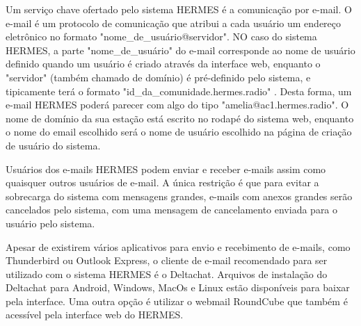 \documentclass[11pt,a4paper]{article}
\begin{document}
Um serviço chave ofertado pelo sistema HERMES é a comunicação por e-mail. O e-mail é um protocolo de comunicação que atribui a cada usuário um endereço eletrônico no formato "nome\_de\_usuário@servidor". NO caso do sistema HERMES, a parte "nome\_de\_usuário" do e-mail corresponde ao nome de usuário definido quando um usuário é criado através da interface web, enquanto o "servidor" (também chamado de domínio) é pré-definido pelo sistema, e tipicamente terá o formato "id\_da\_comunidade.hermes.radio" . Desta forma, um e-mail HERMES poderá parecer com algo do tipo "amelia@ac1.hermes.radio". O nome de domínio da sua estação está escrito no rodapé do sistema web,
enquanto o nome do email escolhido será o nome de usuário escolhido na página de criação de usuário do sistema. 


Usuários dos e-mails HERMES podem enviar e receber e-mails assim como quaisquer outros usuários de e-mail. A única restrição é que para evitar a sobrecarga do sistema com mensagens grandes, e-mails com anexos grandes serão cancelados pelo sistema, com uma mensagem de cancelamento enviada para o usuário pelo sistema.



Apesar de existirem vários aplicativos para envio e recebimento de e-mails, como Thunderbird ou Outlook Express, o cliente de e-mail recomendado para ser utilizado com o sistema HERMES é o Deltachat. Arquivos de instalação do Deltachat para Android, Windows, MacOs e Linux estão disponíveis para baixar pela interface. Uma outra opção é utilizar o webmail RoundCube que também é acessível pela interface web do HERMES.
\end{document}
